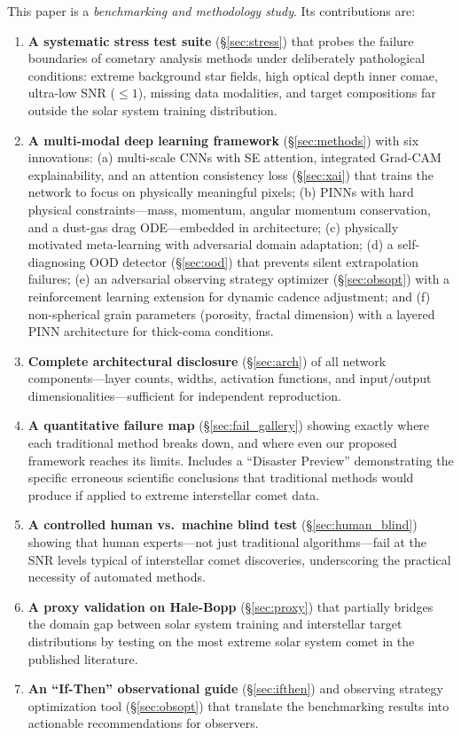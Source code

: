 \documentclass[preprint2]{aastex631}
\begin{document}
This paper is a \textit{benchmarking and methodology study}. Its contributions are:

\begin{enumerate}
    \item \textbf{A systematic stress test suite} (\S\ref{sec:stress}) that probes the failure boundaries of cometary analysis methods under deliberately pathological conditions: extreme background star fields, high optical depth inner comae, ultra-low SNR ($\leq 1$), missing data modalities, and target compositions far outside the solar system training distribution.
    \item \textbf{A multi-modal deep learning framework} (\S\ref{sec:methods}) with six innovations: (a) multi-scale CNNs with SE attention, integrated Grad-CAM explainability, and an attention consistency loss (\S\ref{sec:xai}) that trains the network to focus on physically meaningful pixels; (b) PINNs with hard physical constraints---mass, momentum, angular momentum conservation, and a dust-gas drag ODE---embedded in architecture; (c) physically motivated meta-learning with adversarial domain adaptation; (d) a self-diagnosing OOD detector (\S\ref{sec:ood}) that prevents silent extrapolation failures; (e) an adversarial observing strategy optimizer (\S\ref{sec:obsopt}) with a reinforcement learning extension for dynamic cadence adjustment; and (f) non-spherical grain parameters (porosity, fractal dimension) with a layered PINN architecture for thick-coma conditions.
    \item \textbf{Complete architectural disclosure} (\S\ref{sec:arch}) of all network components---layer counts, widths, activation functions, and input/output dimensionalities---sufficient for independent reproduction.
    \item \textbf{A quantitative failure map} (\S\ref{sec:fail_gallery}) showing exactly where each traditional method breaks down, and where even our proposed framework reaches its limits. Includes a ``Disaster Preview'' demonstrating the specific erroneous scientific conclusions that traditional methods would produce if applied to extreme interstellar comet data.
    \item \textbf{A controlled human vs.\ machine blind test} (\S\ref{sec:human_blind}) showing that human experts---not just traditional algorithms---fail at the SNR levels typical of interstellar comet discoveries, underscoring the practical necessity of automated methods.
    \item \textbf{A proxy validation on Hale-Bopp} (\S\ref{sec:proxy}) that partially bridges the domain gap between solar system training and interstellar target distributions by testing on the most extreme solar system comet in the published literature.
    \item \textbf{An ``If-Then'' observational guide} (\S\ref{sec:ifthen}) and observing strategy optimization tool (\S\ref{sec:obsopt}) that translate the benchmarking results into actionable recommendations for observers.
\end{enumerate}
\end{document}
